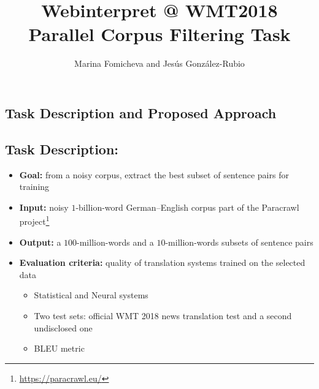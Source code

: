 \documentclass[a0]{sciposter}
\title{Webinterpret @ WMT2018\\Parallel Corpus Filtering Task}
\author{Marina Fomicheva and Jes\'{u}s Gonz\'{a}lez-Rubio}
\institute{AT Language Solutions, Webinterpret}
\begin{document}
\maketitle

\begin{multicols*}{2}



\section*{\Large Task Description and Proposed Approach}

\subsection*{Task Description:}
\begin{itemize}
  \item {\bf Goal:} from a noisy corpus, extract the best subset of sentence pairs for training
  \item {\bf Input:} noisy $1$-billion-word German--English corpus part of the Paracrawl project\footnote{\url{https://paracrawl.eu/}}
  \item {\bf Output:} a $100$-million-words and a $10$-million-words subsets of sentence pairs
  \item {\bf Evaluation criteria:} quality of translation systems trained on the selected data
  \begin{itemize}
    \item Statistical and Neural systems
    \item Two test sets: official WMT 2018 news translation test and a second undisclosed one
    \item BLEU metric
  \end{itemize}
\end{itemize}


\end{multicols*}
\end{document}
